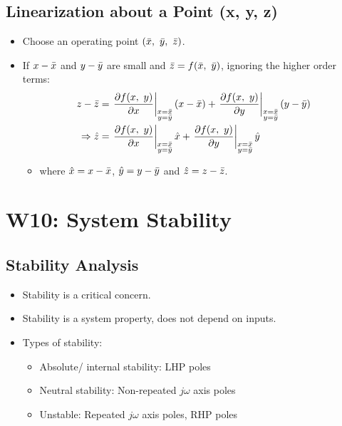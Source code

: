\documentclass[a4paper]{article}
\begin{document}
\subsection{Linearization about a Point (x, y, z)}
\begin{itemize}
    \item Choose an operating point $(\Bar{x},\ \Bar{y},\ \Bar{z})$.
    \item If $x-\Bar{x}$ and $y-\Bar{y}$ are small and $\Bar{z} = f(\Bar{x},\ \Bar{y})$, ignoring the higher order terms:
    \begin{align*}
        z-\Bar{z} &= \left.\frac{\partial f(x,\ y)}{\partial x}\right|_{\substack{x = \Bar{x}\\ y= \Bar{y}}} (x-\Bar{x})+\left.\frac{\partial f(x,\ y)}{\partial y}\right|_{\substack{x = \Bar{x}\\ y= \Bar{y}}} (y-\Bar{y})\\
        \Rightarrow \hat{z} &= \left.\frac{\partial f(x,\ y)}{\partial x}\right|_{\substack{x = \Bar{x}\\ y= \Bar{y}}}\hat{x}+\left.\frac{\partial f(x,\ y)}{\partial y}\right|_{\substack{x = \Bar{x}\\ y= \Bar{y}}}\hat{y}
    \end{align*}
    \begin{itemize}[label=$\circ$]
        \item where $\hat{x} = x-\Bar{x}$, $\hat{y} = y-\Bar{y}$ and $\hat{z} = z-\Bar{z}$.
    \end{itemize}
\end{itemize}

\newpage
\section{W10: System Stability}
\subsection{Stability Analysis}
\begin{itemize}
    \item Stability is a critical concern.
    \item Stability is a system property, does not depend on inputs.
    \item Types of stability:
    \begin{itemize}[label=$\circ$]
        \item Absolute/ internal stability: LHP poles
        \item Neutral stability: Non-repeated $j\omega$ axis poles
        \item Unstable: Repeated $j\omega$ axis poles, RHP poles
    \end{itemize}
\end{itemize}
\end{document}
